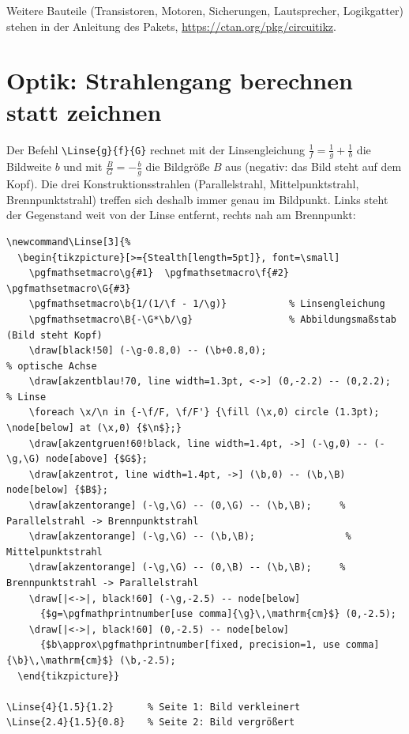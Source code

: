 Weitere Bauteile (Transistoren, Motoren, Sicherungen, Lautsprecher, Logikgatter) stehen in der Anleitung des Pakets, \url{https://ctan.org/pkg/circuitikz}.



\section{Optik: Strahlengang berechnen statt zeichnen}

Der Befehl \texttt{\textbackslash Linse\{g\}\{f\}\{G\}} rechnet mit der Linsengleichung $\frac1f = \frac1g + \frac1b$ die Bildweite $b$ und mit $\frac BG = -\frac bg$ die Bildgröße $B$ aus (negativ: das Bild steht auf dem Kopf). Die drei Konstruktionsstrahlen (Parallelstrahl, Mittelpunktstrahl, Brennpunktstrahl) treffen sich deshalb immer genau im Bildpunkt. Links steht der Gegenstand weit von der Linse entfernt, rechts nah am Brennpunkt:

\begin{lstlisting}[style=latex]
% \Linse{g}{f}{G}   (alle Werte in cm, g > f)
\newcommand\Linse[3]{%
  \begin{tikzpicture}[>={Stealth[length=5pt]}, font=\small]
    \pgfmathsetmacro\g{#1}  \pgfmathsetmacro\f{#2}  \pgfmathsetmacro\G{#3}
    \pgfmathsetmacro\b{1/(1/\f - 1/\g)}           % Linsengleichung
    \pgfmathsetmacro\B{-\G*\b/\g}                 % Abbildungsmaßstab (Bild steht Kopf)
    \draw[black!50] (-\g-0.8,0) -- (\b+0.8,0);                          % optische Achse
    \draw[akzentblau!70, line width=1.3pt, <->] (0,-2.2) -- (0,2.2);    % Linse
    \foreach \x/\n in {-\f/F, \f/F'} {\fill (\x,0) circle (1.3pt); \node[below] at (\x,0) {$\n$};}
    \draw[akzentgruen!60!black, line width=1.4pt, ->] (-\g,0) -- (-\g,\G) node[above] {$G$};
    \draw[akzentrot, line width=1.4pt, ->] (\b,0) -- (\b,\B) node[below] {$B$};
    \draw[akzentorange] (-\g,\G) -- (0,\G) -- (\b,\B);     % Parallelstrahl -> Brennpunktstrahl
    \draw[akzentorange] (-\g,\G) -- (\b,\B);                % Mittelpunktstrahl
    \draw[akzentorange] (-\g,\G) -- (0,\B) -- (\b,\B);     % Brennpunktstrahl -> Parallelstrahl
    \draw[|<->|, black!60] (-\g,-2.5) -- node[below]
      {$g=\pgfmathprintnumber[use comma]{\g}\,\mathrm{cm}$} (0,-2.5);
    \draw[|<->|, black!60] (0,-2.5) -- node[below]
      {$b\approx\pgfmathprintnumber[fixed, precision=1, use comma]{\b}\,\mathrm{cm}$} (\b,-2.5);
  \end{tikzpicture}}

\Linse{4}{1.5}{1.2}      % Seite 1: Bild verkleinert
\Linse{2.4}{1.5}{0.8}    % Seite 2: Bild vergrößert
\end{lstlisting}

